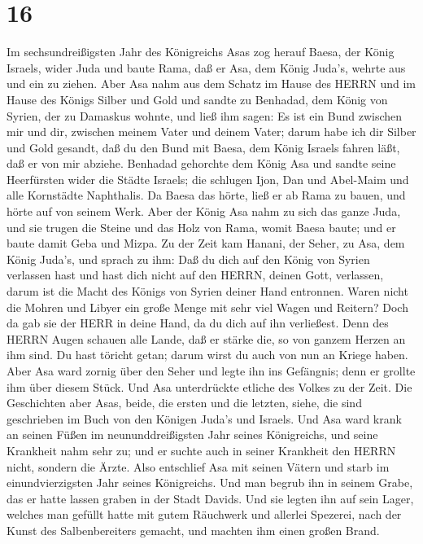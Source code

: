 \hypertarget{section-15}{%
\section{16}\label{section-15}}

 Im sechsundreißigsten Jahr des Königreichs Asas zog herauf
Baesa, der König Israels, wider Juda und baute Rama, daß er Asa, dem
König Juda's, wehrte aus und ein zu ziehen.  Aber Asa nahm
aus dem Schatz im Hause des HERRN und im Hause des Königs Silber und
Gold und sandte zu Benhadad, dem König von Syrien, der zu Damaskus
wohnte, und ließ ihm sagen:  Es ist ein Bund zwischen mir
und dir, zwischen meinem Vater und deinem Vater; darum habe ich dir
Silber und Gold gesandt, daß du den Bund mit Baesa, dem König Israels
fahren läßt, daß er von mir abziehe.  Benhadad gehorchte dem
König Asa und sandte seine Heerfürsten wider die Städte Israels; die
schlugen Ijon, Dan und Abel-Maim und alle Kornstädte Naphthalis.
 Da Baesa das hörte, ließ er ab Rama zu bauen, und hörte auf
von seinem Werk.  Aber der König Asa nahm zu sich das ganze
Juda, und sie trugen die Steine und das Holz von Rama, womit Baesa
baute; und er baute damit Geba und Mizpa.  Zu der Zeit kam
Hanani, der Seher, zu Asa, dem König Juda's, und sprach zu ihm: Daß du
dich auf den König von Syrien verlassen hast und hast dich nicht auf den
HERRN, deinen Gott, verlassen, darum ist die Macht des Königs von Syrien
deiner Hand entronnen.  Waren nicht die Mohren und Libyer
ein große Menge mit sehr viel Wagen und Reitern? Doch da gab sie der
HERR in deine Hand, da du dich auf ihn verließest.  Denn des
HERRN Augen schauen alle Lande, daß er stärke die, so von ganzem Herzen
an ihm sind. Du hast töricht getan; darum wirst du auch von nun an
Kriege haben.  Aber Asa ward zornig über den Seher und
legte ihn ins Gefängnis; denn er grollte ihm über diesem Stück. Und Asa
unterdrückte etliche des Volkes zu der Zeit.  Die
Geschichten aber Asas, beide, die ersten und die letzten, siehe, die
sind geschrieben im Buch von den Königen Juda's und Israels.
 Und Asa ward krank an seinen Füßen im neununddreißigsten
Jahr seines Königreichs, und seine Krankheit nahm sehr zu; und er suchte
auch in seiner Krankheit den HERRN nicht, sondern die Ärzte.
 Also entschlief Asa mit seinen Vätern und starb im
einundvierzigsten Jahr seines Königreichs.  Und man begrub
ihn in seinem Grabe, das er hatte lassen graben in der Stadt Davids. Und
sie legten ihn auf sein Lager, welches man gefüllt hatte mit gutem
Räuchwerk und allerlei Spezerei, nach der Kunst des Salbenbereiters
gemacht, und machten ihm einen großen Brand.

